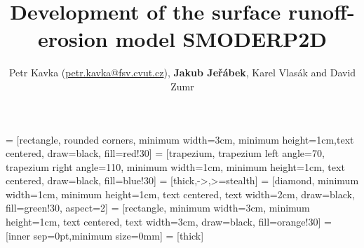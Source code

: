 \title
{
Development of the surface runoff-erosion model SMODERP2D
}

\author{Petr Kavka (\href{mailto:petr.kavka@fsv.cvut.cz}{petr.kavka@fsv.cvut.cz}), {\bf \Large  Jakub Je\v{r}{\'a}bek}, Karel Vlas{\'a}k and David Zumr} %






\newcommand{\mojesekce}[1]{
\section{asdfasdfa}
\begin{center}
\begin{beamercolorbox}[rounded = true, ht = 3ex, dp={0.5ex}]{myblocktitle2}
 {\bf\large\rmfamily\thesection\hspace{1cm}#1}
\end{beamercolorbox}
\end{center}
}

\newcommand{\mojesekcee}[1]{
\section{asdfasdfa}
\begin{center}
\begin{beamercolorbox}[rounded = true, ht = 6ex, dp={0.5ex}]{myblocktitle2}
 {\bf\large\rmfamily\thesection\hspace{1cm}#1}
\end{beamercolorbox}
\end{center}
}

\usepackage{tikz}
\usetikzlibrary{shapes.geometric, arrows}
 = [rectangle, rounded corners, minimum width=3cm, minimum height=1cm,text centered, draw=black, fill=red!30]
 = [trapezium, trapezium left angle=70, trapezium right angle=110, minimum width=1cm, minimum height=1cm, text centered, draw=black, fill=blue!30]
 = [thick,->,>=stealth]
 =  [diamond, minimum width=1cm, minimum height=1cm, text centered, text width=2cm, draw=black, fill=green!30, aspect=2]
 = [rectangle, minimum width=3cm, minimum height=1cm, text centered, text width=3cm, draw=black, fill=orange!30]
 = [inner sep=0pt,minimum size=0mm]
 = [thick]





\usepackage{color}

\newcommand*{\mathcolor}{}
\def\mathcolor#1#{\mathcoloraux{#1}}
\newcommand*{\mathcoloraux}[3]{%
  \protect\leavevmode
  \begingroup
    \color#1{#2}#3%
  \endgroup
}
